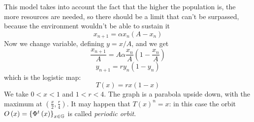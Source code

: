 This model takes into account the fact that the higher the population is, the more resources are needed, so there should be a limit that can't be surpassed, because the environment wouldn't be able to sustain it
$$
	x_{n+1} = \alpha x_n(A-x_n)
$$
Now we change variable, defining $y = x/A$, and we get
$$
	\frac{x_{n+1}}{A} = A\alpha \frac{x_n}{A}\left(1 - \frac{x_n}{A}\right)
$$
$$
	y_{n+1} = r y_n(1-y_n)
$$
which is the logistic map:
\begin{equation}
	T(x) = rx(1-x)
\end{equation}
We take $0 < x < 1$ and $1 < r < 4$. The graph is a parabola upside down, with the maximum at $\left(\frac{x}{2},\frac{r}{4}\right)$.
It may happen that $T\left(x\right)^n=x$: in this case the orbit $O\left(x\right)=\left\lbrace\Phi^t\left(x\right)\right\rbrace_{x \in \mathbb{G}}$ is called \emph{periodic orbit}.